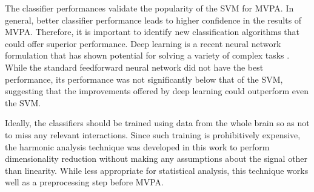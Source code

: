 \documentclass[5p,authoryear]{elsarticle}
\begin{document}

The classifier performances validate the popularity of the SVM for MVPA.
In general, better classifier performance leads to higher confidence in the results of MVPA.
Therefore, it is important to identify new classification algorithms that could offer superior performance.
Deep learning \citep{Hinton2006} is a recent neural network formulation that has shown potential for solving a variety of complex tasks \citep{Ciresan2012}.
While the standard feedforward neural network did not have the best performance, its performance was not significantly below that of the SVM, suggesting that the improvements offered by deep learning could outperform even the SVM.

Ideally, the classifiers should be trained using data from the whole brain so as not to miss any relevant interactions.
Since such training is prohibitively expensive, the harmonic analysis technique was developed in this work to perform dimensionality reduction without making any assumptions about the signal other than linearity.
While less appropriate for statistical analysis, this technique works well as a preprocessing step before MVPA.
\end{document}
